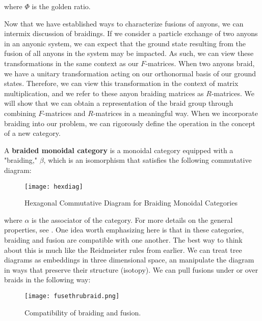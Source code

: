 where $\Phi$ is the golden ratio.

Now that we have established ways to characterize fusions of anyons, we can intermix discussion of braidings. If we consider a particle exchange of two anyons in an anyonic system, we can expect that the ground state resulting from the fusion of all anyons in the system may be impacted. As such, we can view these transformations in the same context as our $F$-matrices. When two anyons braid, we have a unitary transformation acting on our orthonormal basis of our ground states. Therefore, we can view this transformation in the context of matrix multiplication, and we refer to these anyon braiding matrices as $R$-matrices. We will show that we can obtain a representation of the braid group through combining $F$-matrices and $R$-matrices in a meaningful way. When we incorporate braiding into our problem, we can rigorously define the operation in the concept of a new category.


\begin{definition}
	A \textbf{braided monoidal category} is a monoidal category equipped with a "braiding," $\beta$, which is an isomorphism that satisfies the following commutative diagram:
\end{definition}

\begin{figure}[H]
	\centering
	\texttt{[image: hexdiag]}
	\caption{Hexagonal Commutative Diagram for Braiding Monoidal Categories}
\end{figure}

where $\alpha$ is the associator of the category. For more details on the general properties, see \cite{Joyal}. One idea worth emphasizing here is that in these categories, braiding and fusion are compatible with one another. The best way to think about this is much like the Reidmeister rules from earlier. We can treat tree diagrams as embeddings in three dimensional space, an manipulate the diagram in ways that preserve their structure (isotopy). We can pull fusions under or over braids in the following way:

\begin{figure}[H]
	\centering
	\texttt{[image: fusethrubraid.png]}
	\caption{Compatibility of braiding and fusion.}
\end{figure}


